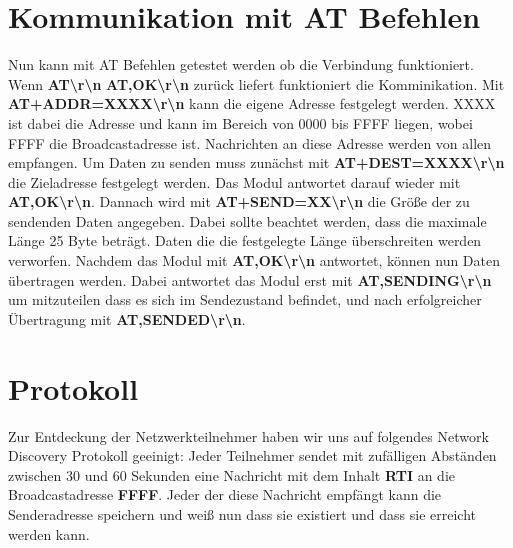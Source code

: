 \documentclass[12pt, a4paper]{article}
\begin{document}
\section{Kommunikation mit AT Befehlen}
Nun kann mit AT Befehlen getestet werden ob die Verbindung funktioniert.
Wenn \textbf{AT\textbackslash{}r\textbackslash{}n}
\textbf{AT,OK\textbackslash{}r\textbackslash{}n} zurück liefert funktioniert
die Komminikation.
Mit \textbf{AT+ADDR=XXXX\textbackslash{}r\textbackslash{}n} kann die eigene
Adresse festgelegt werden. XXXX ist dabei die Adresse und kann im Bereich von
0000 bis FFFF liegen, wobei FFFF die Broadcastadresse ist. Nachrichten an diese
Adresse werden von allen empfangen.
Um Daten zu senden muss zunächst mit \textbf{AT+DEST=XXXX\textbackslash{}r\textbackslash{}n}
die Zieladresse festgelegt werden. Das Modul antwortet darauf wieder mit \textbf{AT,OK\textbackslash{}r\textbackslash{}n}.
Dannach wird mit 
\textbf{AT+SEND=XX\textbackslash{}r\textbackslash{}n} die Größe der zu sendenden
Daten angegeben. Dabei sollte beachtet werden, dass die maximale Länge 25 Byte 
beträgt. Daten die die festgelegte Länge überschreiten werden verworfen.
Nachdem das Modul mit \textbf{AT,OK\textbackslash{}r\textbackslash{}n} antwortet,
können nun Daten übertragen werden. Dabei antwortet das Modul erst mit 
\textbf{AT,SENDING\textbackslash{}r\textbackslash{}n} um mitzuteilen dass es sich im 
Sendezustand befindet, und nach erfolgreicher Übertragung mit
\textbf{AT,SENDED\textbackslash{}r\textbackslash{}n}.

\section{Protokoll}
Zur Entdeckung der Netzwerkteilnehmer haben wir uns auf folgendes 
Network Discovery Protokoll geeinigt:
Jeder Teilnehmer sendet mit zufälligen Abständen zwischen 30 und 60 Sekunden
eine Nachricht mit dem Inhalt \textbf{RTI} an die Broadcastadresse \textbf{FFFF}.
Jeder der diese Nachricht empfängt kann die Senderadresse speichern und 
weiß nun dass sie existiert und dass sie erreicht werden kann.
\end{document}
